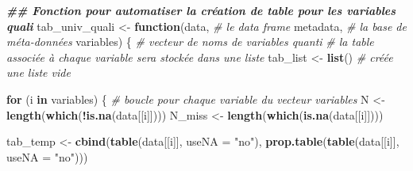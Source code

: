 \documentclass[
]{book}
\newenvironment{Shaded}{\begin{snugshade}}{\end{snugshade}}
\newcommand{\AttributeTok}[1]{\textcolor[rgb]{0.13,0.29,0.53}{#1}}
\newcommand{\CommentTok}[1]{\textcolor[rgb]{0.56,0.35,0.01}{\textit{#1}}}
\newcommand{\ControlFlowTok}[1]{\textcolor[rgb]{0.13,0.29,0.53}{\textbf{#1}}}
\newcommand{\DocumentationTok}[1]{\textcolor[rgb]{0.56,0.35,0.01}{\textbf{\textit{#1}}}}
\newcommand{\FunctionTok}[1]{\textcolor[rgb]{0.13,0.29,0.53}{\textbf{#1}}}
\newcommand{\NormalTok}[1]{#1}
\newcommand{\OtherTok}[1]{\textcolor[rgb]{0.56,0.35,0.01}{#1}}
\newcommand{\SpecialCharTok}[1]{\textcolor[rgb]{0.81,0.36,0.00}{\textbf{#1}}}
\newcommand{\StringTok}[1]{\textcolor[rgb]{0.31,0.60,0.02}{#1}}
\begin{document}
\begin{Shaded}
\begin{Highlighting}[]
\DocumentationTok{\#\# Fonction pour automatiser la création de table pour les variables quali}
\NormalTok{tab\_univ\_quali }\OtherTok{\textless{}{-}} \ControlFlowTok{function}\NormalTok{(data, }\CommentTok{\# le data frame}
\NormalTok{                           metadata, }\CommentTok{\# la base de méta{-}données}
\NormalTok{                           variables) \{ }\CommentTok{\# vecteur de noms de variables quanti}
  \CommentTok{\# la table associée à chaque variable sera stockée dans une liste}
\NormalTok{  tab\_list }\OtherTok{\textless{}{-}} \FunctionTok{list}\NormalTok{() }\CommentTok{\# créée une liste vide}
  
  \ControlFlowTok{for}\NormalTok{ (i }\ControlFlowTok{in}\NormalTok{ variables) \{ }\CommentTok{\# boucle pour chaque variable du vecteur variables}
\NormalTok{    N }\OtherTok{\textless{}{-}} \FunctionTok{length}\NormalTok{(}\FunctionTok{which}\NormalTok{(}\SpecialCharTok{!}\FunctionTok{is.na}\NormalTok{(data[[i]])))}
\NormalTok{    N\_miss }\OtherTok{\textless{}{-}} \FunctionTok{length}\NormalTok{(}\FunctionTok{which}\NormalTok{(}\FunctionTok{is.na}\NormalTok{(data[[i]])))}
    
\NormalTok{    tab\_temp }\OtherTok{\textless{}{-}} \FunctionTok{cbind}\NormalTok{(}\FunctionTok{table}\NormalTok{(data[[i]], }\AttributeTok{useNA =} \StringTok{"no"}\NormalTok{), }
                          \FunctionTok{prop.table}\NormalTok{(}\FunctionTok{table}\NormalTok{(data[[i]], }\AttributeTok{useNA =} \StringTok{"no"}\NormalTok{))) }
    

\end{Highlighting}
\end{Shaded}
\end{document}
